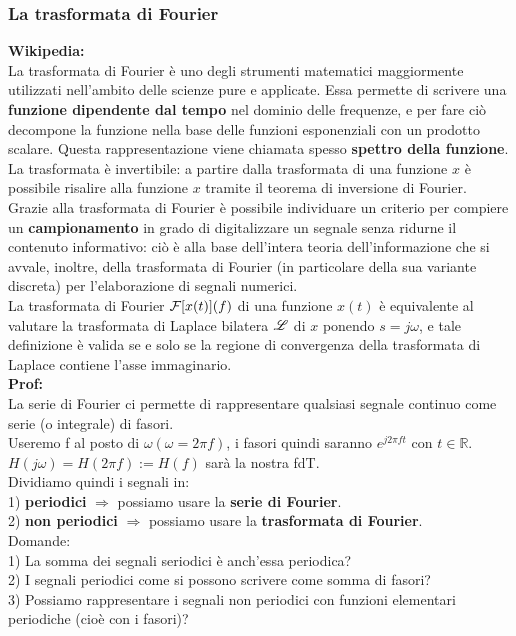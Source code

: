 	\subsubsection{La trasformata di Fourier}
	\textbf{Wikipedia:}\\
	La trasformata di Fourier è uno degli strumenti matematici maggiormente utilizzati nell'ambito delle scienze pure e applicate. Essa permette di scrivere una \textbf{funzione dipendente dal tempo} nel dominio delle frequenze, e per fare ciò decompone la funzione nella base delle funzioni esponenziali con un prodotto scalare. Questa rappresentazione viene chiamata spesso \textbf{spettro della funzione}.\\
	La trasformata è invertibile: a partire dalla trasformata di una funzione ${\hat x}$ è possibile risalire alla funzione $x$ tramite il teorema di inversione di Fourier.\\
	Grazie alla trasformata di Fourier è possibile individuare un criterio per compiere un \textbf{campionamento} in grado di digitalizzare un segnale senza ridurne il contenuto informativo: ciò è alla base dell'intera teoria dell'informazione che si avvale, inoltre, della trasformata di Fourier (in particolare della sua variante discreta) per l'elaborazione di segnali numerici.\\
	La trasformata di Fourier $ \mathcal{F}[ x(t)] (f) $ di una funzione $ x ( t ) $ è equivalente al valutare la trasformata di Laplace bilatera $ \mathscr{L} $ di $x $ ponendo $ s=j\omega $, e tale definizione è valida se e solo se la regione di convergenza della trasformata di Laplace contiene l'asse immaginario.\\
	\textbf{Prof:}\\
	La serie di Fourier ci permette di rappresentare qualsiasi segnale continuo come serie (o integrale) di fasori.\\
	Useremo f al posto di $ \omega (\omega = 2 \pi f)$, i fasori quindi saranno $ e^{j2\pi ft}$ con $ t \in \mathbb{R}$.\\
	$ H(j \omega) = H(2\pi f) := H(f) $ sarà la nostra fdT.\\
	Dividiamo quindi i segnali in:\\
	1) \textbf{periodici} $\Rightarrow$ possiamo usare la \textbf{serie di Fourier}.\\
	2) \textbf{non periodici} $\Rightarrow$ possiamo usare la \textbf{trasformata di Fourier}.\\
	Domande:\\
	1) La somma dei segnali seriodici è anch'essa periodica?\\
	2) I segnali periodici come si possono scrivere come somma di fasori?\\
	3) Possiamo rappresentare i segnali non periodici con funzioni elementari periodiche (cioè con i fasori)?\\
	
